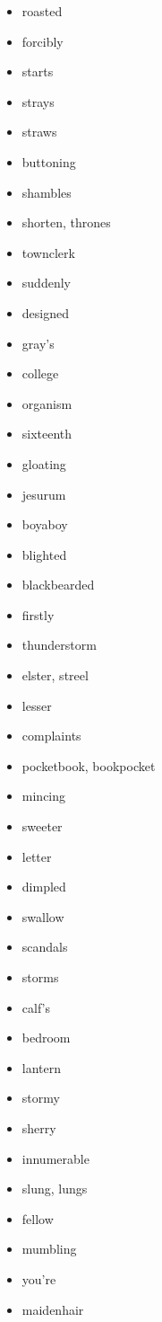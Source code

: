 \documentclass{article}
\begin{document}
\begin{itemize}
    \item roasted
    \item forcibly
    \item starts
    \item strays
    \item straws
    \item buttoning
    \item shambles
    \item shorten, thrones
    \item townclerk
    \item suddenly
    \item designed
    \item gray's
    \item college
    \item organism
    \item sixteenth
    \item gloating
    \item jesurum
    \item boyaboy
    \item blighted
    \item blackbearded
    \item firstly
    \item thunderstorm
    \item elster, streel
    \item lesser
    \item complaints
    \item pocketbook, bookpocket
    \item mincing
    \item sweeter
    \item letter
    \item dimpled
    \item swallow
    \item scandals
    \item storms
    \item calf's
    \item bedroom
    \item lantern
    \item stormy
    \item sherry
    \item innumerable
    \item slung, lungs
    \item fellow
    \item mumbling
    \item you're
    \item maidenhair

\end{itemize}
\end{document}
